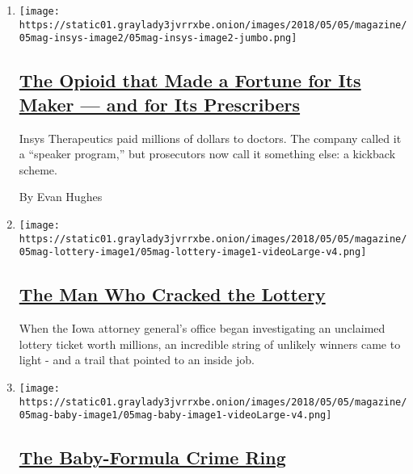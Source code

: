 \begin{enumerate}
\def\labelenumi{\arabic{enumi}.}
\item
  \texttt{[image: https://static01.graylady3jvrrxbe.onion/images/2018/05/05/magazine/05mag-insys-image2/05mag-insys-image2-jumbo.png]}

  \hypertarget{the-opioid-that-made-a-fortune-for-its-maker--and-for-its-prescribers}{%
  \subsection{\texorpdfstring{\href{/interactive/2018/05/02/magazine/money-issue-insys-opioids-kickbacks.html}{The
  Opioid that Made a Fortune for Its Maker --- and for Its
  Prescribers}}{The Opioid that Made a Fortune for Its Maker --- and for Its Prescribers}}\label{the-opioid-that-made-a-fortune-for-its-maker--and-for-its-prescribers}}

  Insys Therapeutics paid millions of dollars to doctors. The company
  called it a ``speaker program,'' but prosecutors now call it something
  else: a kickback scheme.

  By Evan Hughes
\item
  \texttt{[image: https://static01.graylady3jvrrxbe.onion/images/2018/05/05/magazine/05mag-lottery-image1/05mag-lottery-image1-videoLarge-v4.png]}

  \hypertarget{the-man-who-cracked-the-lottery}{%
  \subsection{\texorpdfstring{\href{/interactive/2018/05/03/magazine/money-issue-iowa-lottery-fraud-mystery.html}{The
  Man Who Cracked the
  Lottery}}{The Man Who Cracked the Lottery}}\label{the-man-who-cracked-the-lottery}}

  When the Iowa attorney general's office began investigating an
  unclaimed lottery ticket worth millions, an incredible string of
  unlikely winners came to light - and a trail that pointed to an inside
  job.
\item
  \texttt{[image: https://static01.graylady3jvrrxbe.onion/images/2018/05/05/magazine/05mag-baby-image1/05mag-baby-image1-videoLarge-v4.png]}

  \hypertarget{the-baby-formula-crime-ring}{%
  \subsection{\texorpdfstring{\href{/interactive/2018/05/02/magazine/money-issue-baby-formula-crime-ring.html}{The
  Baby-Formula Crime
  Ring}}{The Baby-Formula Crime Ring}}\label{the-baby-formula-crime-ring}}


\end{enumerate}
